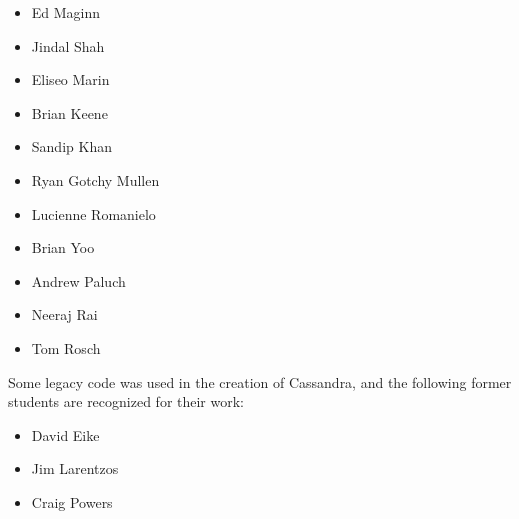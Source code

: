 \begin{itemize}

\item Ed Maginn
\item Jindal Shah
\item Eliseo Marin
\item Brian Keene
\item Sandip Khan
\item Ryan Gotchy Mullen
\item Lucienne Romanielo
\item Brian Yoo
\item Andrew Paluch
\item Neeraj Rai
\item Tom Rosch
\end{itemize}


Some legacy code was used in the creation of Cassandra, and the following former students are recognized for their work:

\begin{itemize}
\item David Eike
\item Jim Larentzos
\item Craig Powers
\end{itemize}
